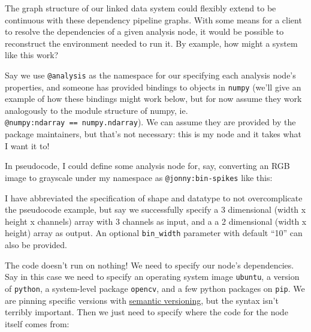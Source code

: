 The graph structure of our linked data system could flexibly extend to
be continuous with these dependency pipeline graphs. With some means for
a client to resolve the dependencies of a given analysis node, it would
be possible to reconstruct the environment needed to run it. By example,
how might a system like this work?

Say we use \texttt{@analysis} as the namespace for our specifying each
analysis node's properties, and someone has provided bindings to objects
in \texttt{numpy} (we'll give an example of how these bindings might
work below, but for now assume they work analogously to the module
structure of numpy, ie. \texttt{@numpy:ndarray\ ==\ numpy.ndarray}). We
can assume they are provided by the package maintainers, but that's not
necessary: this is my node and it takes what I want it to!

In pseudocode, I could define some analysis node for, say, converting an
RGB image to grayscale under my namespace as \texttt{@jonny:bin-spikes}
like this:

\begin{Shaded}
\begin{Highlighting}[]




\end{Highlighting}
\end{Shaded}

I have abbreviated the specification of shape and datatype to not
overcomplicate the pseudocode example, but say we successfully specify a
3 dimensional (width x height x channels) array with 3 channels as
input, and a a 2 dimensional (width x height) array as output. An
optional \texttt{bin\_width} parameter with default ``10'' can also be
provided.

The code doesn't run on nothing! We need to specify our node's
dependencies. Say in this case we need to specify an operating system
image \texttt{ubuntu}, a version of \texttt{python}, a system-level
package \texttt{opencv}, and a few python packages on \texttt{pip}. We
are pinning specific versions with \href{https://semver.org/}{semantic
versioning}, but the syntax isn't terribly important. Then we just need
to specify where the code for the node itself comes from:

